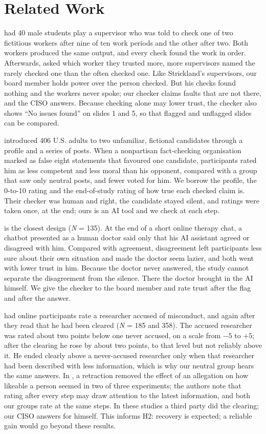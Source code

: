 \documentclass[stu, 12pt]{apa7}
\begin{document}
\section{Related Work}

\textcite{strickland1958} had 40 male students play a supervisor who was told to check one of two fictitious workers after nine of ten work periods and the other after two. Both workers produced the same output, and every check found the work in order. Afterwards, asked which worker they trusted more, more supervisors named the rarely checked one than the often checked one. Like Strickland's supervisors, our board member holds power over the person checked. But his checks found nothing and the workers never spoke; our checker claims faults that are not there, and the CISO answers. Because checking alone may lower trust, the checker also shows \enquote{No issues found} on slides 1 and 5, so that flagged and unflagged slides can be compared.

\textcite{prike2025} introduced 406 U.S. adults to two unfamiliar, fictional candidates through a profile and a series of posts. When a nonpartisan fact-checking organisation marked as false eight statements that favoured one candidate, participants rated him as less competent and less moral than his opponent, compared with a group that saw only neutral posts, and fewer voted for him. We borrow the profile, the 0-to-10 rating and the end-of-study rating of how true each checked claim is. Their checker was human and right, the candidate stayed silent, and ratings were taken once, at the end; ours is an AI tool and we check at each step.

\textcite{chen2026} is the closest design (\emph{N} = 135). At the end of a short online therapy chat, a chatbot presented as a human doctor said only that his AI assistant agreed or disagreed with him. Compared with agreement, disagreement left participants less sure about their own situation and made the doctor seem lazier, and both went with lower trust in him. Because the doctor never answered, the study cannot separate the disagreement from the silence. There the doctor brought in the AI himself. We give the checker to the board member and rate trust after the flag and after the answer.

\textcite{greitemeyer2015} had online participants rate a researcher accused of misconduct, and again after they read that he had been cleared (\emph{N} = 185 and 358). The accused researcher was rated about two points below one never accused, on a scale from $-5$ to $+5$; after the clearing he rose by about two points, to that level but not reliably above it. He ended clearly above a never-accused researcher only when that researcher had been described with less information, which is why our neutral group hears the same answers. In \textcite{mickelberg2025}, a retraction removed the effect of an allegation on how likeable a person seemed in two of three experiments; the authors note that rating after every step may draw attention to the latest information, and both our groups rate at the same steps. In these studies a third party did the clearing; our CISO answers for himself. This informs H2: recovery is expected; a reliable gain would go beyond these results.
\end{document}
